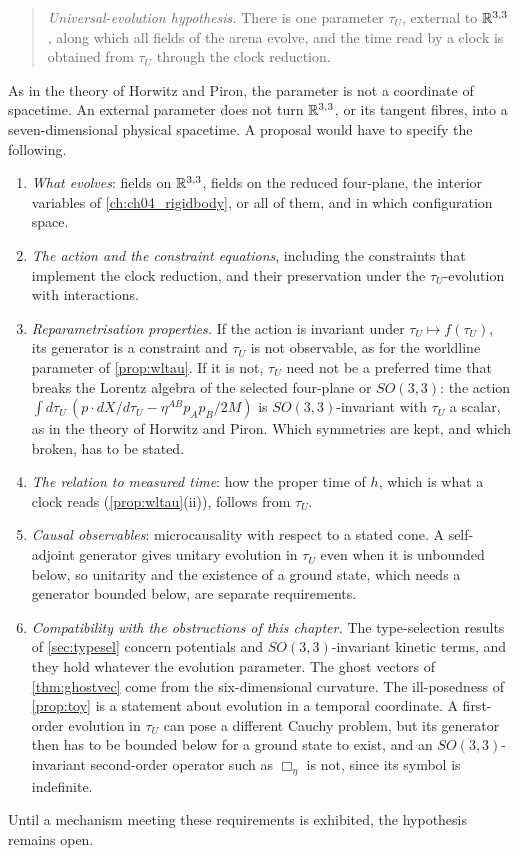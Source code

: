 \begin{quote}
\emph{Universal-evolution hypothesis.} There is one parameter $\tau_U$, external to $\mathbb{R}^{3,3}$, along which all fields of the arena evolve, and
the time read by a clock is obtained from $\tau_U$ through the clock reduction.
\end{quote}

As in the theory of Horwitz and Piron, the parameter is not a coordinate of spacetime. An external
parameter does not turn $\mathbb{R}^{3,3}$, or its tangent fibres, into a seven-dimensional physical spacetime. A proposal would have to specify the
following.
\begin{enumerate}[label=(\arabic*),leftmargin=2.2em]
\item \emph{What evolves}: fields on $\mathbb{R}^{3,3}$, fields on the reduced four-plane, the interior variables of \cref{ch:ch04_rigidbody}, or all of
them, and in which configuration space.
\item \emph{The action and the constraint equations}, including the constraints that implement the clock reduction, and their preservation under
the $\tau_U$-evolution with interactions.
\item \emph{Reparametrisation properties.} If the action is invariant under $\tau_U\mapsto f(\tau_U)$, its generator is a constraint and $\tau_U$ is
not observable, as for the worldline parameter of \cref{prop:wltau}. If it is not, $\tau_U$ need not be a preferred time that breaks the Lorentz
algebra of the selected four-plane or $SO(3,3)$: the action $\int d\tau_U\,(p\cdot dX/d\tau_U-\eta^{AB}p_Ap_B/2M)$ is $SO(3,3)$-invariant with $\tau_U$
a scalar, as in the theory of Horwitz and Piron. Which symmetries are kept, and which broken, has to be stated.
\item \emph{The relation to measured time}: how the proper time of $h$, which is what a clock reads (\cref{prop:wltau}(ii)), follows from $\tau_U$.
\item \emph{Causal observables}: microcausality with respect to a stated cone. A self-adjoint generator gives unitary evolution in $\tau_U$
even when it is unbounded below, so unitarity and the existence of a ground state, which needs a generator bounded below, are separate
requirements.
\item \emph{Compatibility with the obstructions of this chapter.} The type-selection results of \cref{sec:typesel} concern potentials and
$SO(3,3)$-invariant kinetic terms, and they hold whatever the evolution parameter. The ghost vectors of \cref{thm:ghostvec} come from the
six-dimensional curvature. The ill-posedness of \cref{prop:toy} is a statement about evolution in a temporal coordinate. A first-order evolution
in $\tau_U$ can pose a different Cauchy problem, but its generator then has to be bounded below for a ground state to exist, and an
$SO(3,3)$-invariant second-order operator such as $\Box_\eta$ is not, since its symbol is indefinite.
\end{enumerate}
Until a mechanism meeting these requirements is exhibited, the hypothesis remains open.

